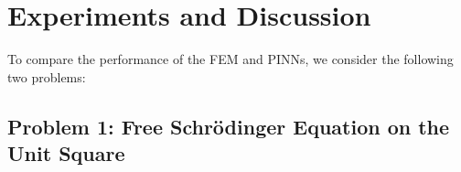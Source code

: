 \documentclass{article}
\theoremstyle{definition}
\theoremstyle{plain}
\theoremstyle{remark}
\begin{document}




\newpage

\section{Experiments and Discussion}

To compare the performance of the FEM and PINNs, we consider the following two problems:

\subsection*{Problem 1: Free Schrödinger Equation on the Unit Square}
\end{document}
